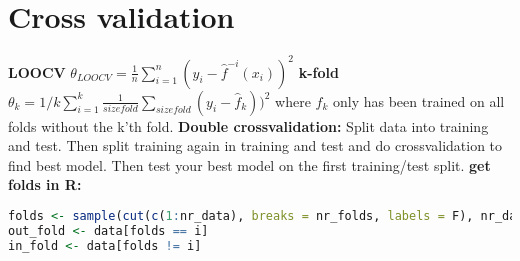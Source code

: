 \section{Cross validation}
\textbf{LOOCV} $\theta_{LOOCV} = \frac{1}{n}\sum_{i=1}^n(y_i - \hat f^{-i}(x_i))^2$
\textbf{k-fold} $\theta_k = 1/k\sum_{i=1}^k \frac{1}{size fold}\sum_{size fold}(y_i-\hat f_k))^2$ where $f_k$ only has been trained on all folds without the k'th fold. 
\textbf{Double crossvalidation: }Split data into training and test. Then split training again in training and test and do crossvalidation to find best model. Then test your best model on the first training/test split. 
\textbf{get folds in R: } \begin{lstlisting}[language=R]
folds <- sample(cut(c(1:nr_data), breaks = nr_folds, labels = F), nr_data, replace = F) 
out_fold <- data[folds == i]
in_fold <- data[folds != i]
\end{lstlisting}